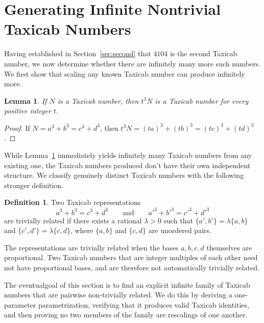 \documentclass[12pt]{amsart}
\newtheorem{lemma}{Lemma}
\theoremstyle{definition}
\newtheorem{definition}{Definition}
\theoremstyle{remark}
\begin{document}
\section{Generating Infinite Nontrivial Taxicab Numbers}\label{sec:infinite}

Having established in Section~\ref{sec:second} that $4104$ is the second 
Taxicab number, we now determine whether there are infinitely many more such numbers. We first show that scaling any known Taxicab number can produce infinitely more.

\begin{lemma}\label{lem:scaling}
  If $N$ is a Taxicab number, then $t^3 N$ is a Taxicab number for every 
  positive integer $t$.
\end{lemma}

\begin{proof}
  If $N = a^3 + b^3 = c^3 + d^3$, then $t^3 N = (ta)^3 + (tb)^3 = 
  (tc)^3 + (td)^3$.
\end{proof}

While Lemma~\ref{lem:scaling} immediately yields infinitely many Taxicab 
numbers from any existing one, the Taxicab numbers produced  don't have their own independent structure. We classify genuinely distinct Taxicab numbers with the following stronger definition.

\begin{definition}
  Two Taxicab representations
  \[
    a^3 + b^3 = c^3 + d^3 \qquad \text{and} \qquad
    a'^3 + b'^3 = c'^3 + d'^3
  \]
  are trivially related if there exists a rational $\lambda > 0$ such
  that $\{a', b'\} = \lambda\{a, b\}$ and $\{c', d'\} = \lambda\{c, d\}$, where $\{a, b\}$ and $\{c, d\}$ are unordered pairs. 
\end{definition}
The representations are trivially related when the bases $a,b,c,d$ themselves are proportional. Two Taxicab numbers that are integer multiples of each other need not have proportional bases, and are therefore not automatically trivially related.

The eventualgoal of this section is to find an explicit infinite family of 
Taxicab numbers that are pairwise non-trivially related. We do this by 
deriving a one-parameter parametrization, verifying that it produces valid 
Taxicab identities, and then proving no two members of the family are 
rescalings of one another.
\end{document}
